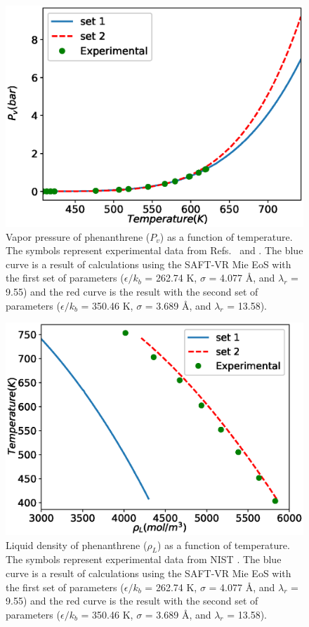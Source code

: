 \documentclass[preprint]{elsarticle}
\begin{document}
	\begin{figure}
		\includegraphics[width=0.9\columnwidth]{Figures/eospv}
		\caption{Vapor pressure of phenanthrene ($P_{v}$) as a function of temperature. The symbols represent experimental data from Refs.~ and . The blue curve is a result of calculations using the SAFT-VR Mie EoS with the first set of parameters ($\epsilon/k_b$ = 262.74 K, $\sigma$ = 4.077 \AA, and $\lambda_r$ = 9.55) and the red curve is the result with the second set of parameters ($\epsilon/k_b$ = 350.46 K, $\sigma$ = 3.689 \AA, and $\lambda_r$ = 13.58).}
		\label{fig:edefitpv}
	\end{figure}
	
		\begin{figure}
			\includegraphics[width=0.9\columnwidth]{Figures/eosdens}
			\caption{Liquid density of phenanthrene ($\rho_{L}$) as a function of temperature. The symbols represent experimental data from NIST \cite{LEMMON-RP91} . The blue curve is a result of calculations using the SAFT-VR Mie EoS with the first set of parameters ($\epsilon/k_b$ = 262.74 K, $\sigma$ = 4.077 \AA, and $\lambda_r$ = 9.55) and the red curve is the result with the second set of parameters ($\epsilon/k_b$ = 350.46 K, $\sigma$ = 3.689 \AA, and $\lambda_r$ = 13.58).}
			\label{fig:edefitdens}
		\end{figure}
	
\end{document}
